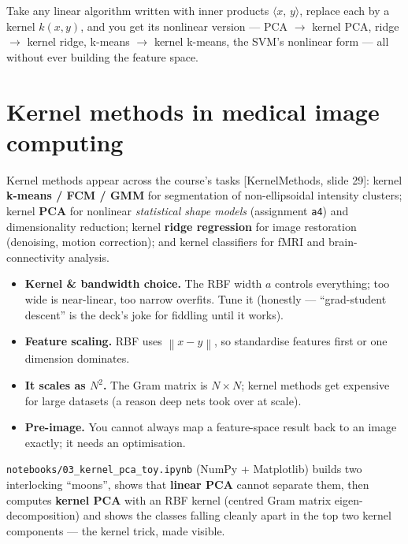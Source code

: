 \documentclass[11pt]{article}
\newcommand{\norm}[1]{\left\lVert #1 \right\rVert}
\newcommand{\inner}[2]{\langle #1,\,#2\rangle}
\newcommand{\deck}[1]{\textsf{\small[#1]}}
\begin{document}
\begin{keybox}
Take any linear algorithm written with inner products $\inner{x}{y}$, replace
each by a kernel $k(x,y)$, and you get its nonlinear version --- PCA $\to$ kernel
PCA, ridge $\to$ kernel ridge, k-means $\to$ kernel k-means, the SVM's nonlinear
form --- all without ever building the feature space.
\end{keybox}

\section{Kernel methods in medical image computing}

Kernel methods appear across the course's tasks \deck{KernelMethods, slide 29}:
kernel \textbf{k-means / FCM / GMM} for segmentation of non-ellipsoidal intensity
clusters; kernel \textbf{PCA} for nonlinear \emph{statistical shape models}
(assignment \texttt{a4}) and dimensionality reduction; kernel \textbf{ridge
regression} for image restoration (denoising, motion correction); and kernel
classifiers for fMRI and brain-connectivity analysis.

\begin{notebox}
\begin{itemize}[nosep,leftmargin=*]
  \item \textbf{Kernel \& bandwidth choice.} The RBF width $a$ controls
  everything; too wide is near-linear, too narrow overfits. Tune it (honestly
  --- ``grad-student descent'' is the deck's joke for fiddling until it works).
  \item \textbf{Feature scaling.} RBF uses $\norm{x-y}$, so standardise features
  first or one dimension dominates.
  \item \textbf{It scales as $N^2$.} The Gram matrix is $N\times N$; kernel methods
  get expensive for large datasets (a reason deep nets took over at scale).
  \item \textbf{Pre-image.} You cannot always map a feature-space result back to an
  image exactly; it needs an optimisation.
\end{itemize}
\end{notebox}

\begin{keybox}
\texttt{notebooks/03\_kernel\_pca\_toy.ipynb} (NumPy + Matplotlib) builds two
interlocking ``moons'', shows that \textbf{linear PCA} cannot separate them, then
computes \textbf{kernel PCA} with an RBF kernel (centred Gram matrix
eigen-decomposition) and shows the classes falling cleanly apart in the top two
kernel components --- the kernel trick, made visible.
\end{keybox}
\end{document}

